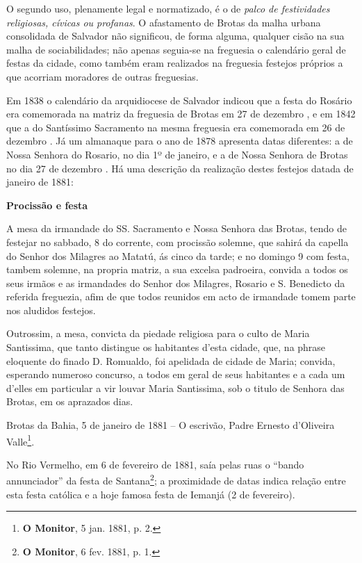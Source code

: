 O segundo uso, plenamente legal e normatizado, é o de \textit{palco de festividades religiosas, cívicas ou profanas}. O afastamento de Brotas da malha urbana consolidada de Salvador não significou, de forma alguma, qualquer cisão na sua malha de sociabilidades; não apenas seguia-se na freguesia o calendário geral de festas da cidade, como também eram realizados na freguesia festejos próprios a que acorriam moradores de outras freguesias.

Em 1838 o calendário da arquidiocese de Salvador indicou que a festa do Rosário era comemorada na matriz da freguesia de Brotas em 27 de dezembro \cite[p.~44]{arcebis_diario_1837}, e em 1842 que a do Santíssimo Sacramento na mesma freguesia era comemorada em 26 de dezembro \cite[p.~55]{arcebis_folhinha_1841}. Já um almanaque para o ano de 1878 apresenta datas diferentes: a de Nossa Senhora do Rosario, no dia 1º de janeiro, e a de Nossa Senhora de Brotas no dia 27 de dezembro \cite[pp.~53,~109]{macosta_almana_1877}. Há uma descrição da realização destes festejos datada de janeiro de 1881:

\begin{citacao}
\textbf{Procissão e festa}

A mesa da irmandade do SS. Sacramento e Nossa Senhora das Brotas, tendo de festejar no sabbado, 8 do corrente, com procissão solemne, que sahirá da capella do Senhor dos Milagres ao Matatú, ás cinco da tarde; e no domingo 9 com festa, tambem solemne, na propria matriz, a sua excelsa padroeira, convida a todos os seus irmãos e as irmandades do Senhor dos Milagres, Rosario e S. Benedicto da referida freguezia, afim de que todos reunidos em acto de irmandade tomem parte nos aludidos festejos.

Outrossim, a mesa, convicta da piedade religiosa para o culto de Maria Santissima, que tanto distingue os habitantes d'esta cidade, que, na phrase eloquente do finado D. Romualdo, foi apelidada de cidade de Maria; convida, esperando numeroso concurso, a todos em geral de seus habitantes e a cada um d'elles em particular a vir louvar Maria Santissima, sob o titulo de Senhora das Brotas, em os aprazados dias.

Brotas da Bahia, 5 de janeiro de 1881 -- O escrivão, Padre Ernesto d'Oliveira Valle\footnote{\textbf{O Monitor}, 5 jan. 1881, p. 2.}.
\end{citacao}

No Rio Vermelho, em 6 de fevereiro de 1881, saía pelas ruas o ``bando annunciador'' da festa de Santana\footnote{\textbf{O Monitor}, 6 fev. 1881, p. 1.}; a proximidade de datas indica relação entre esta festa católica e a hoje famosa festa de Iemanjá (2 de fevereiro).

